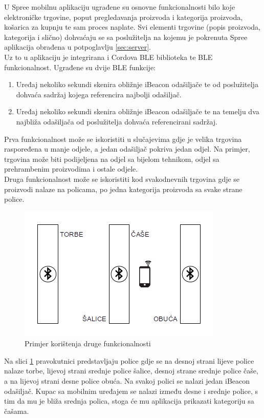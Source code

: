 U Spree mobilnu aplikaciju ugrađene su osnovne funkcionalnosti bilo koje elektroničke trgovine, poput pregledavanja proizvoda i kategorija proizvoda, košarica za kupnju te sam proces naplate. 
Svi elementi trgovine (popis proizvoda, kategorija i slično) dohvaćaju se sa poslužitelja na kojemu je pokrenuta Spree aplikacija obrađena u potpoglavlju \ref{sec:server}.
\\
Uz to u aplikaciju je integrirana i Cordova BLE biblioteka te BLE funkcionalnost.
Ugrađene su dvije BLE funkcije:
\begin{enumerate}
    \item Uređaj nekoliko sekundi skenira obližnje iBeacon odašiljače te od poslužitelja dohvaća sadržaj kojega referencira najbolji odašiljač.
    \item Uređaj nekoliko sekundi skenira obližnje iBeacon odašiljače te na temelju dva najbliža odašiljača od poslužitelja dohvaća referencirani sadržaj.
\end{enumerate}

Prva funkcionalnost može se iskoristiti u slučajevima gdje je velika trgovina raspoređena u manje odjele, a jedan odašiljač pokriva jedan odjel. 
Na primjer, trgovina može biti podijeljena na odjel sa bijelom tehnikom, odjel sa prehrambenim proizvodima i ostale odjele. 
\\
Druga funkcionalnost može se iskoristiti kod svakodnevnih trgovina gdje se proizvodi nalaze na policama, po jedna kategorija proizvoda sa svake strane police.

\begin{figure}[H]
    \centering
    \includegraphics[scale=0.85]{pictures/BLE-funkcionalnost}
    \caption{Primjer korištenja druge funkcionalnosti}
    \label{pic:bleShop}
\end{figure}
Na slici \ref{pic:bleShop} pravokutnici predstavljaju police gdje se na desnoj strani lijeve police nalaze torbe, lijevoj strani srednje police šalice, desnoj strane srednje police čaše, a na lijevoj strani desne police obuća. 
Na svakoj polici se nalazi jedan iBeacon odašiljač. 
Kupac sa mobilnim uređajem se nalazi između desne i srednje police, s tim da mu je bliža srednja polica, stoga će mu aplikacija prikazati kategoriju sa čašama.
\\

